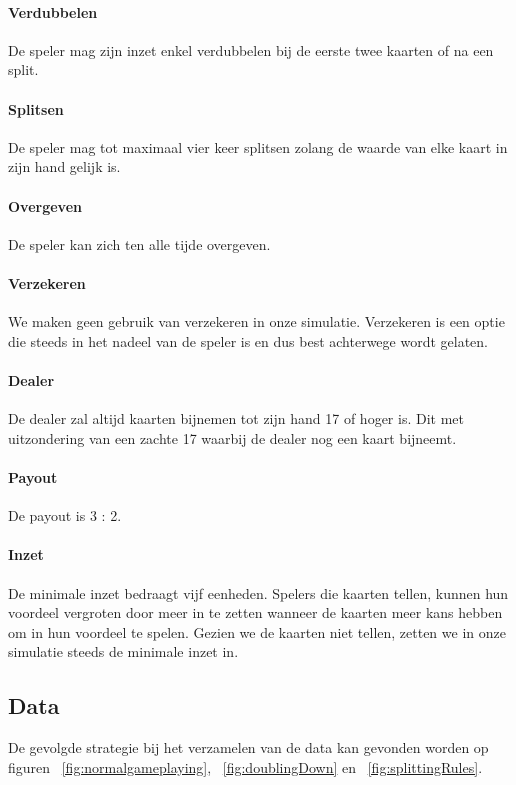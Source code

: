 \documentclass[conference]{IEEEtran}
\begin{document}
\paragraph{Verdubbelen}
De speler mag zijn inzet enkel verdubbelen bij de eerste twee kaarten of na een split.
\paragraph{Splitsen}
De speler mag tot maximaal vier keer splitsen zolang de waarde van elke kaart in zijn hand gelijk is.
\paragraph{Overgeven}
De speler kan zich ten alle tijde overgeven.
\paragraph{Verzekeren}
We maken geen gebruik van verzekeren in onze simulatie. Verzekeren is een optie die steeds in het nadeel van de speler is en dus best achterwege wordt gelaten. \cite{van1997blackjack}
\paragraph{Dealer}
De dealer zal altijd kaarten bijnemen tot zijn hand 17 of hoger is. Dit met uitzondering van een zachte 17 waarbij de dealer nog een kaart bijneemt.
\paragraph{Payout}
De payout is 3 : 2.
\paragraph{Inzet}
De minimale inzet bedraagt vijf eenheden. Spelers die kaarten tellen, kunnen hun voordeel vergroten door meer in te zetten wanneer de kaarten meer kans hebben om in hun voordeel te spelen. Gezien we de kaarten niet tellen, zetten we in onze simulatie steeds de minimale inzet in.


\subsection{Data}
De gevolgde strategie bij het verzamelen van de data kan gevonden worden op figuren ~\ref{fig:normalgameplaying}, ~\ref{fig:doublingDown} en ~\ref{fig:splittingRules}.
\end{document}
